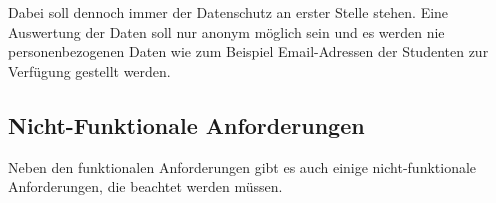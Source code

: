 \begin{itemize}
        Dabei soll dennoch immer der Datenschutz an erster Stelle stehen. Eine Auswertung der Daten soll nur anonym möglich sein und es werden nie personenbezogenen Daten wie zum Beispiel Email-Adressen der Studenten zur Verfügung gestellt werden.  
  
\end{itemize}



\subsection{Nicht-Funktionale Anforderungen}
Neben den funktionalen Anforderungen gibt es auch einige nicht-funktionale Anforderungen, die beachtet werden müssen.
